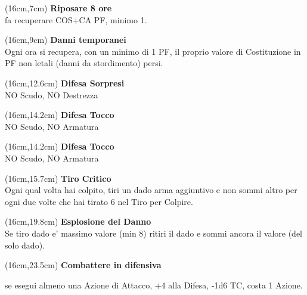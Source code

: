 \documentclass[a4paper,12 pt,openany]{book}
\begin{document}
	\begin{textblock*}{4cm}(16cm,7cm) %
\textbf{Riposare 8 ore} \\fa recuperare COS+CA PF, minimo 1.
		\end{textblock*}


		\begin{textblock*}{4cm}(16cm,9cm) %
\textbf{Danni temporanei}\\ Ogni ora si recupera, con un minimo di 1 PF, il proprio valore di Costituzione in PF non letali (danni da stordimento) persi.
	\end{textblock*}


\begin{textblock*}{4cm}(16cm,12.6cm) %
\textbf{Difesa Sorpresi}\\NO Scudo, NO Destrezza
\end{textblock*}

\begin{textblock*}{4cm}(16cm,14.2cm) %
\textbf{Difesa Tocco}\\ NO Scudo, NO Armatura
\end{textblock*}



\begin{textblock*}{4cm}(16cm,14.2cm) %
	\textbf{Difesa Tocco}\\ NO Scudo, NO Armatura
\end{textblock*}


\begin{textblock*}{4cm}(16cm,15.7cm) %
\textbf{Tiro Critico}\\
Ogni qual volta hai colpito, tiri un dado arma aggiuntivo e non sommi altro per ogni due volte che hai tirato 6 nel Tiro per Colpire.
\end{textblock*}

\begin{textblock*}{4cm}(16cm,19.8cm) %
\textbf{Esplosione del Danno}\\
Se tiro dado e' massimo valore (min 8) ritiri il dado e sommi ancora il valore (del solo dado).
\end{textblock*}


\begin{textblock*}{4cm}(16cm,23.5cm) %
\textbf{Combattere in difensiva}

se esegui almeno una Azione di Attacco, +4 alla Difesa, -1d6 TC, costa 1 Azione.
\end{textblock*}
\end{document}
